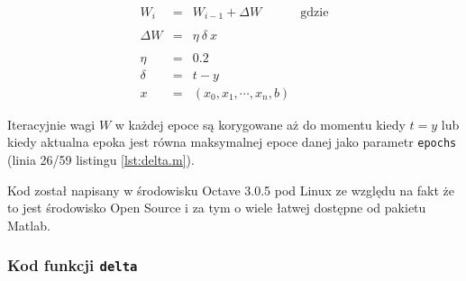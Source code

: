\documentclass[pointlessnumbers, abstracton, headsepline, a4paper]{scrartcl}
\begin{document}
\begin{equation}
\label{eq:2}
\begin{array}{rcll}
W_{i} & = & W_{i-1} + \Delta W & \textrm{gdzie} \\
\\
\Delta W & = & \eta \ \delta \ x \\
\\
\eta & = & 0.2 \\
\delta & = & t-y \\
x & = & (x_0, x_1, \cdots, x_n, b)
\end{array}
\end{equation}

Iteracyjnie wagi $W$ w każdej epoce są korygowane aż do momentu kiedy $t = y$ lub kiedy aktualna epoka jest równa maksymalnej epoce danej jako parametr \texttt{epochs} (linia 26/59 listingu \ref{lst:delta.m}).

Kod został napisany w środowisku Octave 3.0.5 pod Linux ze względu na fakt że to jest środowisko Open Source i za tym o wiele łatwej dostępne od pakietu Matlab.

\subsubsection{Kod funkcji \texttt{delta}}
\begin{center}

\end{center}
\end{document}
